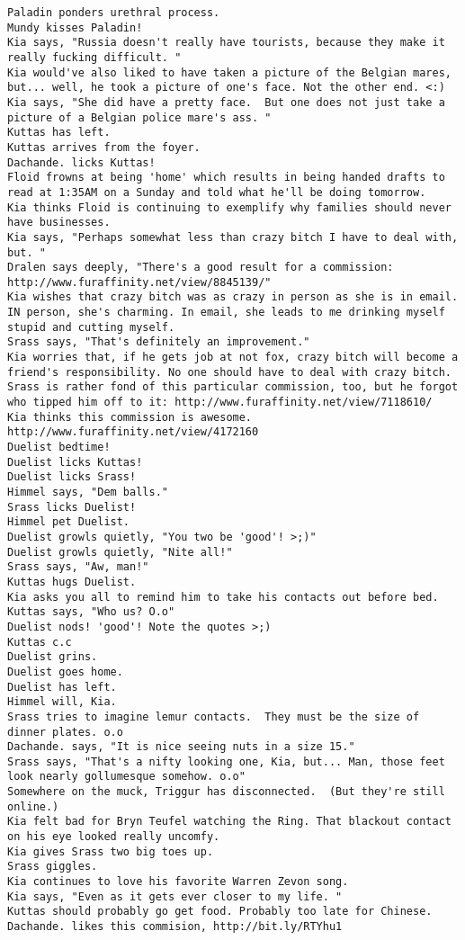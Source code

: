 \begin{verbatim}
Paladin ponders urethral process.
Mundy kisses Paladin!
Kia says, "Russia doesn't really have tourists, because they make it really fucking difficult. "
Kia would've also liked to have taken a picture of the Belgian mares, but... well, he took a picture of one's face. Not the other end. <:)
Kia says, "She did have a pretty face.  But one does not just take a picture of a Belgian police mare's ass. "
Kuttas has left.
Kuttas arrives from the foyer.
Dachande. licks Kuttas!
Floid frowns at being 'home' which results in being handed drafts to read at 1:35AM on a Sunday and told what he'll be doing tomorrow.
Kia thinks Floid is continuing to exemplify why families should never have businesses.
Kia says, "Perhaps somewhat less than crazy bitch I have to deal with, but. "
Dralen says deeply, "There's a good result for a commission: http://www.furaffinity.net/view/8845139/"
Kia wishes that crazy bitch was as crazy in person as she is in email. IN person, she's charming. In email, she leads to me drinking myself stupid and cutting myself.
Srass says, "That's definitely an improvement."
Kia worries that, if he gets job at not fox, crazy bitch will become a friend's responsibility. No one should have to deal with crazy bitch.
Srass is rather fond of this particular commission, too, but he forgot who tipped him off to it: http://www.furaffinity.net/view/7118610/
Kia thinks this commission is awesome. http://www.furaffinity.net/view/4172160
Duelist bedtime!
Duelist licks Kuttas!
Duelist licks Srass!
Himmel says, "Dem balls."
Srass licks Duelist!
Himmel pet Duelist.
Duelist growls quietly, "You two be 'good'! >;)"
Duelist growls quietly, "Nite all!"
Srass says, "Aw, man!"
Kuttas hugs Duelist.
Kia asks you all to remind him to take his contacts out before bed.
Kuttas says, "Who us? O.o"
Duelist nods! 'good'! Note the quotes >;)
Kuttas c.c
Duelist grins.
Duelist goes home.
Duelist has left.
Himmel will, Kia.
Srass tries to imagine lemur contacts.  They must be the size of dinner plates. o.o
Dachande. says, "It is nice seeing nuts in a size 15."
Srass says, "That's a nifty looking one, Kia, but... Man, those feet look nearly gollumesque somehow. o.o"
Somewhere on the muck, Triggur has disconnected.  (But they're still online.)
Kia felt bad for Bryn Teufel watching the Ring. That blackout contact on his eye looked really uncomfy.
Kia gives Srass two big toes up.
Srass giggles.
Kia continues to love his favorite Warren Zevon song.
Kia says, "Even as it gets ever closer to my life. "
Kuttas should probably go get food. Probably too late for Chinese.
Dachande. likes this commision, http://bit.ly/RTYhu1

\end{verbatim}
